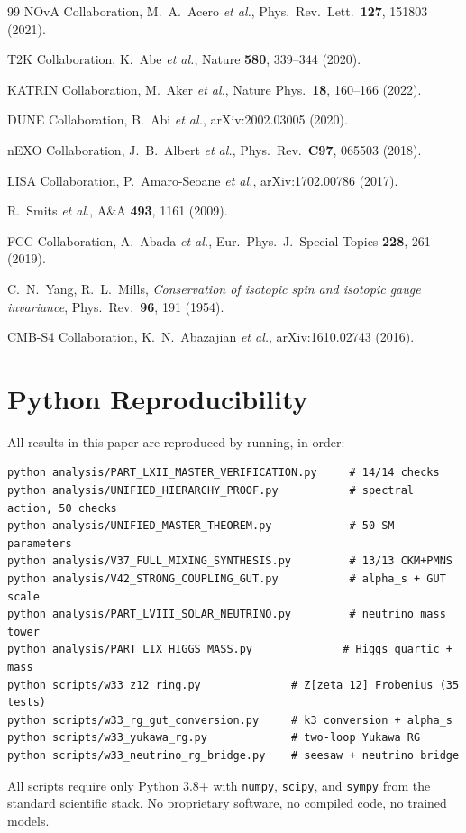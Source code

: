 \documentclass[12pt,a4paper]{article}
\begin{document}
\begin{thebibliography}{99}
 NOvA Collaboration, M.~A.~Acero \textit{et al.},
  Phys.~Rev.~Lett.\ \textbf{127}, 151803 (2021).

 T2K Collaboration, K.~Abe \textit{et al.},
  Nature \textbf{580}, 339--344 (2020).

 KATRIN Collaboration, M.~Aker \textit{et al.},
  Nature Phys.\ \textbf{18}, 160--166 (2022).

 DUNE Collaboration, B.~Abi \textit{et al.},
  arXiv:2002.03005 (2020).

 nEXO Collaboration, J.~B.~Albert \textit{et al.},
  Phys.~Rev.\ \textbf{C97}, 065503 (2018).

 LISA Collaboration, P.~Amaro-Seoane \textit{et al.},
  arXiv:1702.00786 (2017).

 R.~Smits \textit{et al.},
  A\&A \textbf{493}, 1161 (2009).

 FCC Collaboration, A.~Abada \textit{et al.},
  Eur.~Phys.~J.~Special Topics \textbf{228}, 261 (2019).

 C.~N.~Yang, R.~L.~Mills,
  \textit{Conservation of isotopic spin and isotopic gauge invariance},
  Phys.~Rev.\ \textbf{96}, 191 (1954).

 CMB-S4 Collaboration, K.~N.~Abazajian \textit{et al.},
  arXiv:1610.02743 (2016).

\end{thebibliography}

\appendix

\section{Python Reproducibility}
\label{app:code}

All results in this paper are reproduced by running, in order:
\begin{verbatim}
python analysis/PART_LXII_MASTER_VERIFICATION.py     # 14/14 checks
python analysis/UNIFIED_HIERARCHY_PROOF.py           # spectral action, 50 checks
python analysis/UNIFIED_MASTER_THEOREM.py            # 50 SM parameters
python analysis/V37_FULL_MIXING_SYNTHESIS.py         # 13/13 CKM+PMNS
python analysis/V42_STRONG_COUPLING_GUT.py           # alpha_s + GUT scale
python analysis/PART_LVIII_SOLAR_NEUTRINO.py         # neutrino mass tower
python analysis/PART_LIX_HIGGS_MASS.py              # Higgs quartic + mass
python scripts/w33_z12_ring.py              # Z[zeta_12] Frobenius (35 tests)
python scripts/w33_rg_gut_conversion.py     # k3 conversion + alpha_s
python scripts/w33_yukawa_rg.py             # two-loop Yukawa RG
python scripts/w33_neutrino_rg_bridge.py    # seesaw + neutrino bridge
\end{verbatim}
All scripts require only Python 3.8+ with \texttt{numpy}, \texttt{scipy},
and \texttt{sympy} from the standard scientific stack.
No proprietary software, no compiled code, no trained models.
\end{document}
